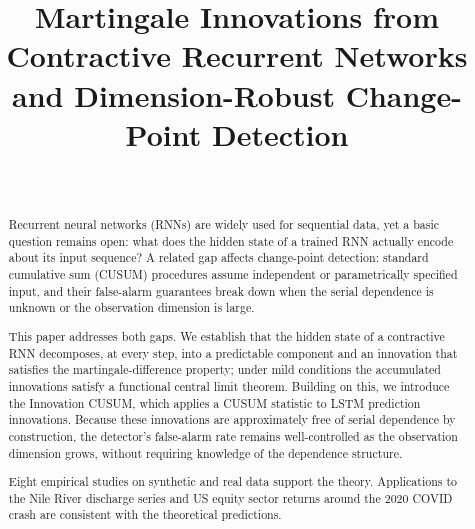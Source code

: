 \documentclass[bj,authoryear]{imsart}
\theoremstyle{plain}
\theoremstyle{definition}
\begin{document}
\begin{frontmatter}

\title{Martingale Innovations from Contractive Recurrent Networks
       and Dimension-Robust Change-Point Detection}

\author{~%
  }
\address{Institute of Statistical Science, Academia Sinica,
  128 Academia Road, Section~2, Nankang, Taipei 115, Taiwan.
  }

\begin{abstract}
Recurrent neural networks (RNNs) are widely used for sequential data, yet a basic question remains open:
what does the hidden state of a trained RNN actually encode about its input
sequence?
A related gap affects change-point detection: standard cumulative sum (CUSUM)
procedures assume independent or parametrically specified input, and their
false-alarm guarantees break down when the serial dependence is unknown or
the observation dimension is large.

This paper addresses both gaps.
We establish that the hidden state of a contractive RNN decomposes, at every
step, into a predictable component and an innovation that satisfies the
martingale-difference property; under mild conditions the accumulated innovations
satisfy a functional central limit theorem.
Building on this, we introduce the Innovation CUSUM, which applies a CUSUM
statistic to LSTM prediction innovations.
Because these innovations are approximately free of serial dependence by
construction, the detector's false-alarm rate remains well-controlled as the
observation dimension grows, without requiring knowledge of the dependence
structure.

Eight empirical studies on synthetic and real data support the theory.
Applications to the Nile River discharge series and US equity sector returns
around the 2020 COVID crash are consistent with the theoretical predictions.

\end{abstract}

\begin{keyword}
\end{keyword}

\end{frontmatter}
\end{document}
